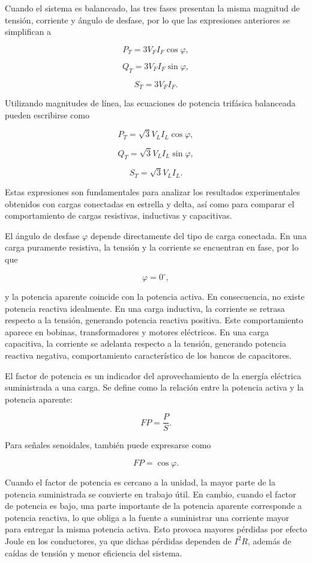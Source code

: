 	Cuando el sistema es balanceado, las tres fases presentan la misma magnitud de tensión, corriente y ángulo de desfase, por lo que las expresiones anteriores se simplifican a
	
	\[
	P_T = 3V_FI_F\cos\varphi,
	\]
	
	\[
	Q_T = 3V_FI_F\sin\varphi,
	\]
	
	\[
	S_T = 3V_FI_F.
	\]
	
	Utilizando magnitudes de línea, las ecuaciones de potencia trifásica balanceada pueden escribirse como
	
	\[
	P_T = \sqrt{3}V_LI_L\cos\varphi,
	\]
	
	\[
	Q_T = \sqrt{3}V_LI_L\sin\varphi,
	\]
	
	\[
	S_T = \sqrt{3}V_LI_L.
	\]
	
	Estas expresiones son fundamentales para analizar los resultados experimentales obtenidos con cargas conectadas en estrella y delta, así como para comparar el comportamiento de cargas resistivas, inductivas y capacitivas.
	
	El ángulo de desfase $\varphi$ depende directamente del tipo de carga conectada. En una carga puramente resistiva, la tensión y la corriente se encuentran en fase, por lo que
	
	\[
	\varphi = 0^\circ,
	\]
	
	y la potencia aparente coincide con la potencia activa. En consecuencia, no existe potencia reactiva idealmente. En una carga inductiva, la corriente se retrasa respecto a la tensión, generando potencia reactiva positiva. Este comportamiento aparece en bobinas, transformadores y motores eléctricos. En una carga capacitiva, la corriente se adelanta respecto a la tensión, generando potencia reactiva negativa, comportamiento característico de los bancos de capacitores.
	
	El factor de potencia es un indicador del aprovechamiento de la energía eléctrica suministrada a una carga. Se define como la relación entre la potencia activa y la potencia aparente:
	
	\[
	FP = \frac{P}{S}.
	\]
	
	Para señales senoidales, también puede expresarse como
	
	\[
	FP = \cos\varphi.
	\]
	
	Cuando el factor de potencia es cercano a la unidad, la mayor parte de la potencia suministrada se convierte en trabajo útil. En cambio, cuando el factor de potencia es bajo, una parte importante de la potencia aparente corresponde a potencia reactiva, lo que obliga a la fuente a suministrar una corriente mayor para entregar la misma potencia activa. Esto provoca mayores pérdidas por efecto Joule en los conductores, ya que dichas pérdidas dependen de $I^2R$, además de caídas de tensión y menor eficiencia del sistema.
	
